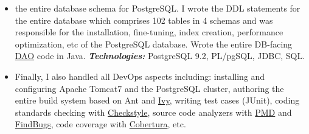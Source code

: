 \documentclass[helvetica,english,logo,notitle,totpages,utf8]{europecv2013}
\newcommand{\technologies}[0]{\textbf{\textit{Technologies:}}}
\begin{document}
\begin{europecv}
{\begin{itemize}
    \technologies{} Java, \href{http://www.jfree.org/jfreechart/}{JFreeChart}
    \item the entire database schema for PostgreSQL. I wrote the DDL statements for the entire database which comprises 102 tables in 4 schemas and was responsible for the installation, fine-tuning, index creation, performance optimization, etc of the PostgreSQL database. Wrote the entire DB-facing \href{https://en.wikipedia.org/wiki/Database_abstraction_layer}{DAO} code in Java.
      \technologies{} PostgreSQL 9.2, PL/pgSQL, JDBC, SQL.
    \item Finally, I also handled all DevOps aspects including: installing and configuring Apache Tomcat7 and the PostgreSQL cluster, authoring the entire build system based on
      Ant and \href{http://ant.apache.org/ivy/}{Ivy}, writing test cases (JUnit), coding standards checking with \href{http://checkstyle.sourceforge.net/}{Checkstyle}, source code analyzers with
      \href{https://pmd.github.io/}{PMD} and \href{http://findbugs.sourceforge.net/}{FindBugs},
      code coverage with \href{http://cobertura.github.io/cobertura/}{Cobertura}, etc.
      \end{itemize}
                                     }




\end{europecv}
\end{document}
